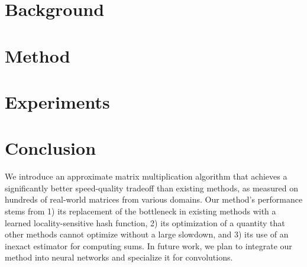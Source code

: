 \documentclass{article}  %
\begin{document}
% 


\section{Background} \label{sec:background}



\section{Method} \label{sec:method}




% 

\section{Experiments} \label{sec:results}




\section{Conclusion}

We introduce an approximate matrix multiplication algorithm that achieves a significantly better speed-quality tradeoff than existing methods, as measured on hundreds of real-world matrices from various domains. Our method's performance stems from 1) its replacement of the bottleneck in existing methods with a learned locality-sensitive hash function, 2) its optimization of a quantity that other methods cannot optimize without a large slowdown, and 3) its use of an inexact estimator for computing sums. In future work, we plan to integrate our method into neural networks and specialize it for convolutions.
\end{document}
